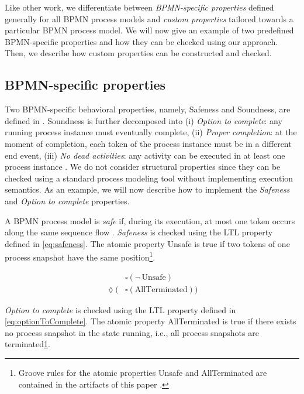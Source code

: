 \documentclass[submission, copyright, creativecommons]{eptcs}
\begin{document}
Like other work, we differentiate between \emph{BPMN-specific properties} defined generally for all BPMN process models and \emph{custom properties} tailored towards a particular BPMN process model.
We will now give an example of two predefined BPMN-specific properties and how they can be checked using our approach.
Then, we describe how custom properties can be constructed and checked.

\subsection{BPMN-specific properties}
Two BPMN-specific behavioral properties, namely, Safeness and Soundness, are defined in \cite{corradiniClassificationBPMNCollaborations2018}.
Soundness is further decomposed into (i) \emph{Option to complete}: any running process instance must eventually complete, (ii) \emph{Proper completion}: at the moment of completion, each token of the process instance must be in a different end event, (iii) \emph{No dead activities}: any activity can be executed in at least one process instance \cite{corradiniClassificationBPMNCollaborations2018}.
We do not consider structural properties since they can be checked using a standard process modeling tool without implementing execution semantics.
As an example, we will now describe how to implement the \emph{Safeness} and \emph{Option to complete} properties.

A BPMN process model is \emph{safe} if, during its execution, at most one token occurs along the same sequence flow \cite{corradiniClassificationBPMNCollaborations2018}.
\emph{Safeness} is checked using the LTL property defined in \eqref{eq:safeness}.
The atomic property \textsf{Unsafe} is true if two tokens of one process snapshot have the same position\footnote{\label{footnote:atomicProps}Groove rules for the atomic properties \textsf{Unsafe} and \textsf{AllTerminated} are contained in the artifacts of this paper \cite{timkrauterArtifactsTERMGRAPH2022}.}.

\begin{align}
    & \square (\neg \,\text{Unsafe}) \label{eq:safeness} \\
    \lozenge (& \square(\text{AllTerminated})) \label{eq:optionToComplete}
\end{align}

\emph{Option to complete} is checked using the LTL property defined in \eqref{eq:optionToComplete}.
The atomic property \textsf{AllTerminated} is true if there exists no process snapshot in the state running, i.e., all process snapshots are terminated\cref{footnote:atomicProps}.
\end{document}
